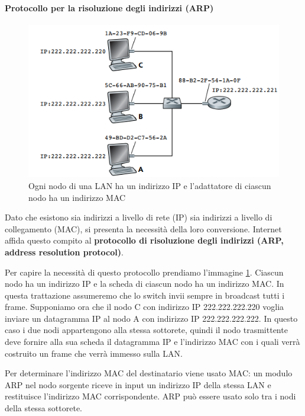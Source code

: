 \documentclass[11pt,a4paper]{article}
\begin{document}
\paragraph{Protocollo per la risoluzione degli indirizzi (ARP)}
\begin{figure}
	\includegraphics[scale=0.6]{img/084.png}
	\caption{Ogni nodo di una LAN ha un indirizzo IP e l'adattatore di ciascun nodo ha un indirizzo MAC}
	\label{fig: 084}
\end{figure}
Dato che esistono sia indirizzi a livello di rete (IP) sia indirizzi a livello di collegamento (MAC), si presenta la necessità della loro conversione. Internet affida questo compito al \textbf{protocollo di risoluzione degli indirizzi (ARP, address resolution protocol)}.

Per capire la necessità di questo protocollo prendiamo l'immagine \ref{fig: 084}. Ciascun nodo ha un indirizzo IP e la scheda di ciascun nodo ha un indirizzo MAC. In questa trattazione assumeremo che lo switch invii sempre in broadcast tutti i frame. Supponiamo ora che il nodo C con indirizzo IP 222.222.222.220 voglia inviare un datagramma IP al nodo A con indirizzo IP 222.222.222.222. In questo caso i due nodi appartengono alla stessa sottorete, quindi il nodo trasmittente deve fornire alla sua scheda il datagramma IP e l'indirizzo MAC con i quali verrà costruito un frame che verrà immesso sulla LAN.

Per determinare l'indirizzo MAC del destinatario viene usato MAC: un modulo ARP nel nodo sorgente riceve in input un indirizzo IP della stessa LAN e restituisce l'indirizzo MAC corrispondente. ARP può essere usato solo tra i nodi della stessa sottorete.
\end{document}
